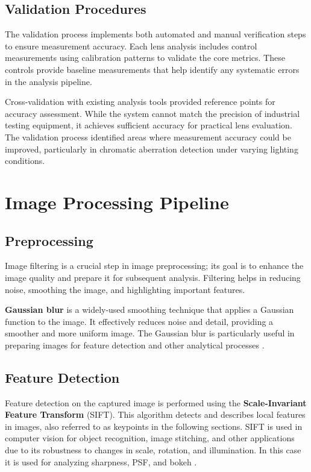 \subsection{Validation Procedures} 
The validation process implements both automated and manual verification steps to ensure measurement accuracy. Each lens analysis includes control measurements using calibration patterns to validate the core metrics. These controls provide baseline measurements that help identify any systematic errors in the analysis pipeline.

Cross-validation with existing analysis tools provided reference points for accuracy assessment. While the system cannot match the precision of industrial testing equipment, it achieves sufficient accuracy for practical lens evaluation. The validation process identified areas where measurement accuracy could be improved, particularly in chromatic aberration detection under varying lighting conditions.
\section{Image Processing Pipeline}

\subsection{Preprocessing}
Image filtering is a crucial step in image preprocessing; its goal is to enhance the image quality and prepare it for subsequent analysis. Filtering helps in reducing noise, smoothing the image, and highlighting important features.

\textbf{Gaussian blur} is a widely-used smoothing technique that applies a Gaussian function to the image. It effectively reduces noise and detail, providing a smoother and more uniform image. The Gaussian blur is particularly useful in preparing images for feature detection and other analytical processes \cite{gaussian}.

\subsection{Feature Detection}
Feature detection on the captured image is performed using the \textbf{Scale-Invariant Feature Transform} (SIFT). This algorithm detects and describes local features in images, also referred to as keypoints in the following sections. SIFT is used in computer vision for object recognition, image stitching, and other applications due to its robustness to changes in scale, rotation, and illumination. In this case it is used for analyzing sharpness, PSF, and bokeh \cite{Sift}.

